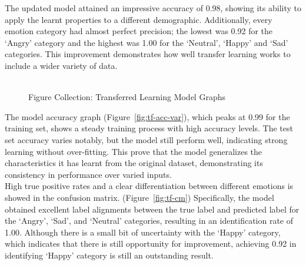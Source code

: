 \indent The updated model attained an impressive accuracy of 0.98, showing its ability to apply the learnt properties to a different demographic.
Additionally, every emotion category had almost perfect precision; the lowest was 0.92 for the `Angry' category and the highest was 1.00 for the `Neutral', `Happy' and `Sad' categories.
This improvement demonstrates how well transfer learning works to include a wider variety of data. 
\\
\begin{figure}[H]
    \centering
    \qquad
    \vspace{0.5cm}
    \\
    \scriptsize{Figure Collection: Transferred Learning Model Graphs}
\end{figure}
\indent The model accuracy graph (Figure~\ref{fig:tf-acc-var}), which peaks at 0.99 for the training set, shows a steady training process with high accuracy levels.
The test set accuracy varies notably, but the model still perform well, indicating strong learning without over-fitting.
This prove that the model generalizes the characteristics it has learnt from the original dataset, demonstrating its consistency in performance over varied inputs.
\\
\indent High true positive rates and a clear differentiation between different emotions is showed in the confusion matrix. (Figure~\ref{fig:tf-cm})
Specifically, the model obtained excellent label alignments between the true label and predicted label for the `Angry', `Sad', and `Neutral' categories, resulting in an identification rate of 1.00.
Although there is a small bit of uncertainty with the `Happy' category, which indicates that there is still opportunity for improvement, achieving 0.92 in identifying `Happy' category is still an outstanding result.

